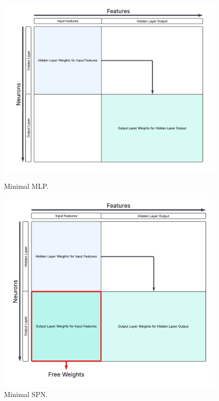 \begin{figure}[h!]
    \centering
    \begin{minipage}[t]{0.48\textwidth}
        \centering
        \includegraphics[width=\textwidth]{Figures/Methodology/Minimal_MLP_Weights.png}
        \caption{Minimal MLP.}
        \label{fig:minMLP}
    \end{minipage}%
    \hfill
    \begin{minipage}[t]{0.46\textwidth}
        \centering
        \includegraphics[width=\textwidth]{Figures/Methodology/Minimal_SPN_Weights.png}
        \caption{Minimal SPN.}
        \label{fig:minSpn}
    \end{minipage}
\end{figure}

